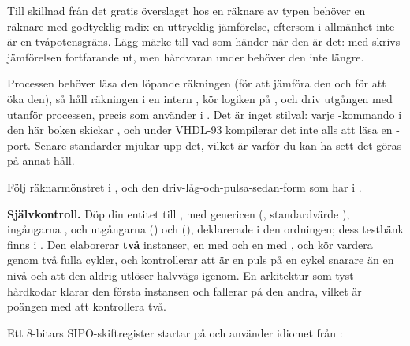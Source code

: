 Till skillnad från det gratis överslaget hos en räknare av typen 
behöver en räknare med godtycklig radix en uttrycklig jämförelse, eftersom  i allmänhet
inte är en tvåpotensgräns. Lägg märke till vad som händer när den är det: med 
skrivs jämförelsen fortfarande ut, men hårdvaran under behöver den inte längre.

\note[Tips]Processen behöver läsa den löpande räkningen (för att jämföra den och för att öka den),
så håll räkningen i en intern , kör logiken på
, och driv utgången med  utanför processen, precis som
 använder  i . Det är inget stilval: varje
-kommando i den här boken skickar , och under VHDL-93 kompilerar det inte
alls att läsa en -port. Senare standarder mjukar upp det, vilket är varför du kan ha sett
det göras på annat håll.

Följ räknarmönstret i , och den driv-låg-och-pulsa-sedan-form som
 har i .


\begin{selfcheck}
\textbf{Självkontroll.} Döp din entitet till , med genericen 
(, standardvärde ), ingångarna ,
 och utgångarna  () och 
(), deklarerade i den ordningen; dess testbänk finns i .
Den elaborerar \textbf{två} instanser, en med  och en med , och kör
vardera genom två fulla cykler, och kontrollerar att  är en puls på en cykel snarare än
en nivå och att den aldrig utlöser halvvägs igenom. En arkitektur som tyst hårdkodar 
klarar den första instansen och fallerar på den andra, vilket är poängen med att kontrollera två.
\end{selfcheck}


\label{c6:ex:sipotrace}
Ett 8-bitars SIPO-skiftregister startar på  och använder idiomet från
:

